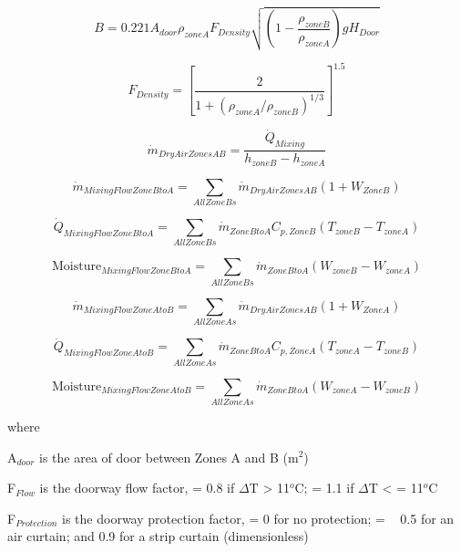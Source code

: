 \begin{equation}
B = 0.221 A_{door} \rho_{zoneA} F_{Density} \sqrt{ (1-\frac{\rho_{zoneB}}{\rho_{zoneA}}) g H_{Door} }
\end{equation}

\begin{equation}
F_{Density} = \left[\frac{2}{1+(\rho_{zoneA}/\rho_{zoneB})^{1/3}} \right]^{1.5}
\end{equation}

\begin{equation}
\dot{m}_{DryAirZonesAB} = \frac{\dot{Q}_{Mixing}}{h_{zoneB}-h_{zoneA}}
\end{equation}

\begin{equation}
\dot{m}_{MixingFlowZoneBtoA} = \sum_{AllZoneBs} \dot{m}_{DryAirZonesAB}(1+W_{ZoneB})
\end{equation}

\begin{equation}
\dot{Q}_{MixingFlowZoneBtoA} = \sum_{AllZoneBs} \dot{m}_{ZoneBtoA} C_{p,ZoneB} (T_{zoneB}-T_{zoneA})
\end{equation}

\begin{equation}
\text{Moisture}_{MixingFlowZoneBtoA} = \sum_{AllZoneBs} \dot{m}_{ZoneBtoA} (W_{zoneB}-W_{zoneA})
\end{equation}

\begin{equation}
\dot{m}_{MixingFlowZoneAtoB} = \sum_{AllZoneAs} \dot{m}_{DryAirZonesAB} (1+W_{ZoneA})
\end{equation}

\begin{equation}
\dot{Q}_{MixingFlowZoneAtoB} = \sum_{AllZoneAs} \dot{m}_{ZoneBtoA} C_{p,ZoneA} (T_{zoneA}-T_{zoneB})
\end{equation}

\begin{equation}
\text{Moisture}_{MixingFlowZoneAtoB} = \sum_{AllZoneAs} \dot{m}_{ZoneBtoA} (W_{zoneA}-W_{zoneB})
\end{equation}

where

A\(_{door}\) is the area of door between Zones A and B (m\(^{2}\))

F\(_{Flow}\) is the doorway flow factor, = 0.8 if $\Delta$T \textgreater{} 11\(^{o}\)C; = 1.1 if $\Delta$T \textless{} = 11\(^{o}\)C

F\(_{Protection}\) is the doorway protection factor, = 0 for no protection; = ~ 0.5 for an air curtain; and 0.9 for a strip curtain (dimensionless)

